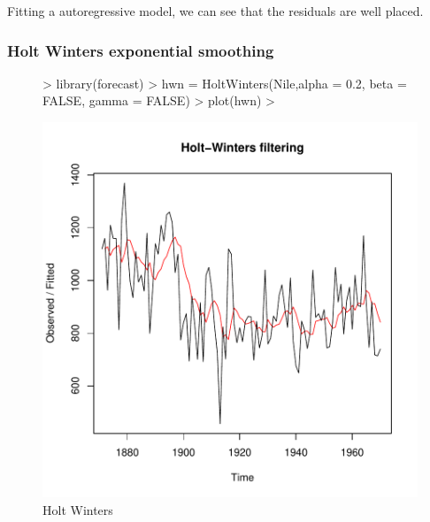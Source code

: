 \documentclass[11pt, a4paper]{article} %
\begin{document}
\noindent Fitting a autoregressive model, we can see that the residuals are well placed.

\subsubsection{Holt Winters exponential smoothing}

\begin{figure}
\centering
\begin{Schunk}
\begin{Sinput}
> library(forecast)
> hwn = HoltWinters(Nile,alpha = 0.2, beta = FALSE, gamma = FALSE)
> plot(hwn)
> 
\end{Sinput}
\end{Schunk}
\includegraphics{alles-037}
\caption{Holt Winters}
\end{figure}
\end{document}

